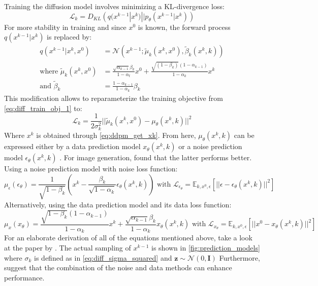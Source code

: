 Training the diffusion model involves minimizing a KL-divergence loss:
\begin{equation} 
    \mathcal{L}_k = D_{KL} \left( q(x^{k-1}|x^k) || p_\theta(x^{k-1}|x^k) \right) \label{eq:diff_train_obj_1}
\end{equation}
For more stability in training and since $x^0$ is known, the forward process $q(x^{k-1}|x^k)$ is replaced by:
\begin{align}
    q(x^{k-1}|x^k, x^0) &= \mathcal{N} (x^{k-1}; \tilde{\mu}_k(x^k, x^0), \tilde{\beta}_k(x^k, k)) \\
    \text{where } \tilde{\mu}_k(x^k, x^0) &= \frac{\sqrt{\alpha_{k-1}}\beta_k}{1 - \alpha_t}x^0 + \frac{\sqrt{(1 - \beta_k)}(1 - \alpha_{k-1})}{1 - \alpha_k}x^k \\
    \text{and } \tilde{\beta}_k &= \frac{1 - \alpha_{k-1}}{1 - \alpha_k}\beta_k 
\end{align}
This modification allows to reparameterize the training objective from \autoref{eq:diff_train_obj_1} to:
\begin{equation} 
    \mathcal{L}_k = \frac{1}{2\sigma^2_k} || \tilde{\mu}_k(x^k, x^0) - \mu_\theta(x^k, k)||^2 
\end{equation}
Where $x^k$ is obtained through \autoref{eq:ddpm_get_xk}. From here, $\mu_\theta(x^k, k)$ can be expressed either by a data prediction model $x_\theta(x^k, k)$ or a noise prediction model $\epsilon_\theta(x^k, k)$ \cite{ho_denoising_2020, benny_dynamic_2022, chang_design_2023}. For image generation, \textcite{ho_denoising_2020} found that the latter performs better. Using a noise prediction model with noise loss function:
\begin{equation} \label{eq:ddpm_noise_prediction}
        \mu_\epsilon(\epsilon_\theta) = \frac{1}{\sqrt{1 - \beta_k}}\left(x^k - \frac{\beta_k}{\sqrt{1 - \alpha_k}} \epsilon_\theta(x^k, k) \right) \text{ with } \mathcal{L}_{\epsilon_\theta} = \mathbb{E}_{k, x^0, \epsilon} \left[|| \epsilon - \epsilon_\theta(x^k, k)||^2 \right]
\end{equation}
Alternatively, using the data prediction model and its data loss function:
\begin{equation} \label{eq:ddpm_data_prediction}
    \mu_x(x_\theta) = \frac{\sqrt{1 - \beta_k}(1 - \alpha_{k-1})}{1 - \alpha_k} x^k + \frac{\sqrt{\alpha_{k-1}}\beta_k}{1 - \alpha_k} x_\theta(x^k, k) \text{ with } \mathcal{L}_{x_\theta} = \mathbb{E}_{k, x^0, \epsilon} \left[|| x^0 - x_\theta(x^k, k)||^2 \right]
\end{equation}
For an elaborate derivation of all of the equations mentioned above, take a look at the paper by \textcite{luo_understanding_2022}. The actual sampling of $x^{k-1}$ is shown in \autoref{fig:prediction_models} where $\sigma_k$ is defined as in \autoref{eq:diff_sigma_squared} and $\mathbf{z} \sim \mathcal{N}(0, \mathbf{I})$ Furthermore, \textcite{benny_dynamic_2022} suggest that the combination of the noise and data methods can enhance performance.

